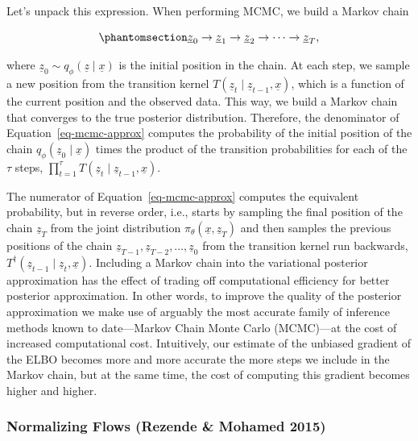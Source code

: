 \documentclass[
]{scrartcl}
\begin{document}
\begin{refsection}
Let's unpack this expression. When performing MCMC, we build a Markov
chain

\begin{equation}\phantomsection\label{eq-mcmc-chain}{
\underline{z}_0 \to \underline{z}_1 \to \underline{z}_2 \to \cdots 
\to \underline{z}_T,
}\end{equation}

where \(\underline{z}_0 \sim q_\phi(\underline{z} \mid \underline{x})\)
is the initial position in the chain. At each step, we sample a new
position from the transition kernel
\(T(\underline{z}_{t} \mid \underline{z}_{t-1},
\underline{x})\), which is a function of the current position and the
observed data. This way, we build a Markov chain that converges to the
true posterior distribution. Therefore, the denominator of
Equation~\ref{eq-mcmc-approx} computes the probability of the initial
position of the chain \(q_\phi(\underline{z}_0 \mid
\underline{x})\) times the product of the transition probabilities for
each of the \(\tau\) steps, \(\prod_{t=1}^\tau T(\underline{z}_{t} \mid
\underline{z}_{t-1}, \underline{x})\).

The numerator of Equation~\ref{eq-mcmc-approx} computes the equivalent
probability, but in reverse order, i.e., starts by sampling the final
position of the chain \(\underline{z}_T\) from the joint distribution
\(π_\theta(\underline{x},
\underline{z}_T)\) and then samples the previous positions of the chain
\(\underline{z}_{T-1}, \underline{z}_{T-2}, \ldots, \underline{z}_0\)
from the transition kernel run backwards,
\(T^\dagger(\underline{z}_{t-1} \mid
\underline{z}_{t}, \underline{x})\). Including a Markov chain into the
variational posterior approximation has the effect of trading off
computational efficiency for better posterior approximation. In other
words, to improve the quality of the posterior approximation we make use
of arguably the most accurate family of inference methods known to
date---Markov Chain Monte Carlo (MCMC)---at the cost of increased
computational cost. Intuitively, our estimate of the unbiased gradient
of the ELBO becomes more and more accurate the more steps we include in
the Markov chain, but at the same time, the cost of computing this
gradient becomes higher and higher.

\subsubsection{Normalizing Flows (Rezende \& Mohamed
2015)}\label{sec-normalizing-flows}


\end{refsection}
\end{document}
